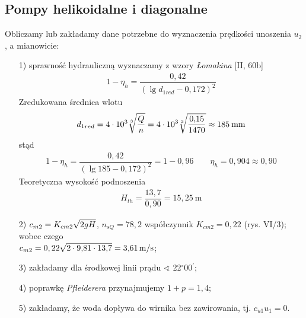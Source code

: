\documentclass[a4paper]{book}
\begin{document}
\pagestyle{headings}
\begin{center}
\renewcommand{\thechapter}{\Roman{chapter}}
\chapter{Pompy helikoidalne i diagonalne}
\end{center}
\newpage
%		
	Obliczamy lub zak{\l}adamy dane potrzebne do wyznaczenia prędkości unoszenia $u_2$, a mianowicie:
\begin{enumerate}[itemsep=0.1mm]
	\item[1)] sprawność hydrauliczną wyznaczamy z wzory \textit{Łomakina} [II, 60b]
\begin{gather*}
%
1 - \eta_h = \dfrac{0{,}42}{(\lg{d_{1red}} - 0{,}172)^2}
%
\end{gather*}
Zredukowana średnica wlotu
\begin{gather*}
%
d_{1red} = 4 \cdot 10^3 \sqrt[3]{\strut \dfrac{Q}{n}} = 4\cdot10^3 \sqrt[3]{\strut \dfrac{0{,}15}{1470}}\approx 185 \: \mathrm{mm}
%
\end{gather*}
stąd
\begin{gather*}
%
1 - \eta_h = \dfrac{0{,}42}{(\lg{185} - 0{,}172)^2} = 1 - 0{,}96 \qquad \eta_h = 0{,}904 \approx  0{,}90
%
\end{gather*}
Teoretyczna wysokość podnoszenia
\begin{gather*}
%
H_{th} = \dfrac{13,7}{0,90} = 15{,}25 \: \text{m}
%
\end{gather*}
%
	\item[2)] $c_{m2} = K_{cm2}\sqrt{\smash[b]{2gH}}$, $n_{sQ} = 78{,}2$ współczynnik $K_{cm2} = 0{,}22$ (rys. VI/3);  wobec czego \\
$c_{m2} = 0,22\sqrt{\smash[b]{2\cdot9{,}81\cdot13{,}7}} = 3{,}61 \, \mathrm{m/s}$;
	\item[3)] zakładamy dla środkowej linii prądu  $\sphericalangle$ 22$^{\circ}$00$^\prime$;
	\item[4)] poprawkę \textit{Pfleiderera} przynajmujemy $1 + p = 1{,}4$;
	\item[5)] zakładamy, że woda dopływa do wirnika bez zawirowania, tj. $c_{u1}u_1 = 0.$
\end{enumerate}
\end{document}
